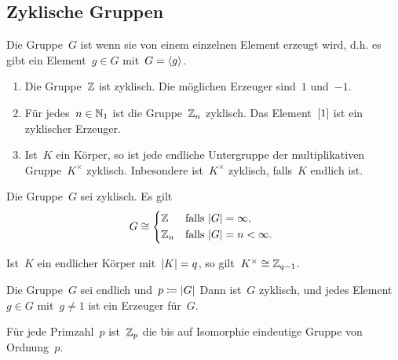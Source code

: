 \subsection{Zyklische Gruppen}

\begin{definition}
  Die Gruppe~$G$ ist  wenn sie von einem einzelnen Element erzeugt wird, d.h. es gibt ein Element~$g \in G$ mit~$G = \langle g\rangle$.
\end{definition}

\begin{example}
  \leavevmode
  \begin{enumerate}
    \item
      Die Gruppe~$\mathbb{Z}$ ist zyklisch.
      Die möglichen Erzeuger sind~$1$ und~$-1$.
    \item
      Für jedes~$n \in \mathbb{N}_1$ ist die Gruppe~$\mathbb{Z}_n$ zyklisch.
      Das Element~$[1]$ ist ein zyklischer Erzeuger.
    \item
      Ist~$K$ ein Körper, so ist jede endliche Untergruppe der multiplikativen Gruppe~$K^\times$ zyklisch.
      Inbesondere ist~$K^\times$ zyklisch, falls~$K$ endlich ist.
  \end{enumerate}
\end{example}

\begin{theorem}
  Die Gruppe~$G$ sei zyklisch.
  Es gilt
  \[
    G
    \cong
    \begin{cases*}
        \Integer
        &
        falls~$\card{G} = \infty$,
        \\
        \Integer_n
        &
        falls~$\card{G} = n < \infty$.
    \end{cases*}
  \]
\end{theorem}

\begin{corollary}
  Ist~$K$ ein endlicher Körper mit~$\lvert K\rvert = q$, so gilt~$K^\times \cong \mathbb{Z}_{q-1}$.
\end{corollary}

\begin{proposition}
  Die Gruppe~$G$ sei endlich und~$p \coloneqq \lvert G\rvert$
  Dann ist~$G$ zyklisch, und jedes Element~$g \in G$ mit~$g \neq 1$ ist ein Erzeuger für~$G$.
\end{proposition}

\begin{corollary}
  Für jede Primzahl~$p$ ist~$\mathbb{Z}_p$ die bis auf Isomorphie eindeutige Gruppe von Ordnung~$p$.
\end{corollary}



